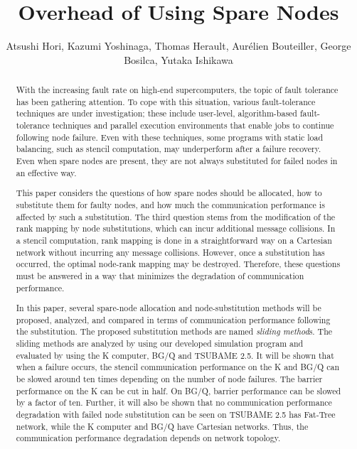 \documentclass[Afour,times,sagev]{sagej}
\begin{document}
\title{Overhead of Using Spare Nodes}
\author{Atsushi Hori, 
  Kazumi Yoshinaga,
  Thomas Herault,
  Aur\'elien Bouteiller,
  George Bosilca,
  Yutaka Ishikawa}




\begin{abstract}

With the increasing fault rate on high-end supercomputers, the topic
of fault tolerance has been gathering attention. To cope with this
situation, various fault-tolerance techniques are under
investigation; these include user-level, algorithm-based
fault-tolerance techniques and parallel execution environments that
enable jobs to continue following node failure. Even with these
techniques, some programs with static load balancing, such as
stencil computation, may underperform after a failure recovery. Even
when spare nodes are present, they are not always
substituted for failed nodes in an effective way.

This paper considers the questions of how spare nodes should be
allocated, how to substitute them for faulty nodes, and how much the
communication performance is affected by such a substitution.
The third question stems from the modification of the rank mapping by
node substitutions, which can incur additional message collisions.
In a stencil computation, rank mapping is done in a
straightforward way on a Cartesian network without incurring any
message collisions. However, once a substitution has occurred, the
optimal node-rank mapping may be destroyed. Therefore, these questions
must be answered in a way that minimizes the degradation of
communication performance.

In this paper, several spare-node allocation and node-substitution
methods will be proposed, analyzed, and compared in terms of
communication performance following the substitution. The proposed
substitution methods are named {\it sliding method}s. The sliding
methods are analyzed by using our developed simulation
program and evaluated by using the K computer, BG/Q and TSUBAME
2.5. It will be shown that when a failure occurs, the stencil
communication performance on the K and BG/Q can be slowed around ten
times depending on the number of node failures.  
The barrier performance on the K can be cut in half. On
BG/Q, barrier performance can be slowed by a factor of ten. 
Further, it will also be shown that no communication performance
degradation with failed node substitution can be seen on TSUBAME 2.5
has Fat-Tree network, while the K computer and BG/Q
have Cartesian networks. Thus, the communication performance
degradation depends on network topology.
\end{abstract}
\end{document}
